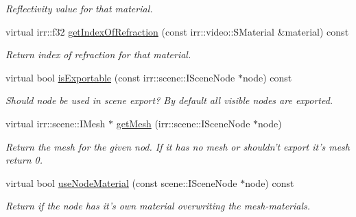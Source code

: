 \begin{DoxyCompactItemize}
\begin{DoxyCompactList}\small\item\em Reflectivity value for that material. \end{DoxyCompactList}\item 
\hypertarget{classirr_1_1scene_1_1_c_collada_mesh_writer_properties_a23044162722d6f3367a1f4e5fb8eb907}{virtual irr\-::f32 \hyperlink{classirr_1_1scene_1_1_c_collada_mesh_writer_properties_a23044162722d6f3367a1f4e5fb8eb907}{get\-Index\-Of\-Refraction} (const irr\-::video\-::\-S\-Material \&material) const }\label{classirr_1_1scene_1_1_c_collada_mesh_writer_properties_a23044162722d6f3367a1f4e5fb8eb907}

\begin{DoxyCompactList}\small\item\em Return index of refraction for that material. \end{DoxyCompactList}\item 
\hypertarget{classirr_1_1scene_1_1_c_collada_mesh_writer_properties_a25ff8053c6c3f8611b57034506c1a693}{virtual bool \hyperlink{classirr_1_1scene_1_1_c_collada_mesh_writer_properties_a25ff8053c6c3f8611b57034506c1a693}{is\-Exportable} (const irr\-::scene\-::\-I\-Scene\-Node $\ast$node) const }\label{classirr_1_1scene_1_1_c_collada_mesh_writer_properties_a25ff8053c6c3f8611b57034506c1a693}

\begin{DoxyCompactList}\small\item\em Should node be used in scene export? By default all visible nodes are exported. \end{DoxyCompactList}\item 
\hypertarget{classirr_1_1scene_1_1_c_collada_mesh_writer_properties_aa14d66794e69028b1010c4d32a6390d5}{virtual irr\-::scene\-::\-I\-Mesh $\ast$ \hyperlink{classirr_1_1scene_1_1_c_collada_mesh_writer_properties_aa14d66794e69028b1010c4d32a6390d5}{get\-Mesh} (irr\-::scene\-::\-I\-Scene\-Node $\ast$node)}\label{classirr_1_1scene_1_1_c_collada_mesh_writer_properties_aa14d66794e69028b1010c4d32a6390d5}

\begin{DoxyCompactList}\small\item\em Return the mesh for the given nod. If it has no mesh or shouldn't export it's mesh return 0. \end{DoxyCompactList}\item 
\hypertarget{classirr_1_1scene_1_1_c_collada_mesh_writer_properties_a48d4c28d31109b72e5cabf5b53ff9ad8}{virtual bool \hyperlink{classirr_1_1scene_1_1_c_collada_mesh_writer_properties_a48d4c28d31109b72e5cabf5b53ff9ad8}{use\-Node\-Material} (const scene\-::\-I\-Scene\-Node $\ast$node) const }\label{classirr_1_1scene_1_1_c_collada_mesh_writer_properties_a48d4c28d31109b72e5cabf5b53ff9ad8}

\begin{DoxyCompactList}\small\item\em Return if the node has it's own material overwriting the mesh-\/materials. \end{DoxyCompactList}\end{DoxyCompactItemize}


